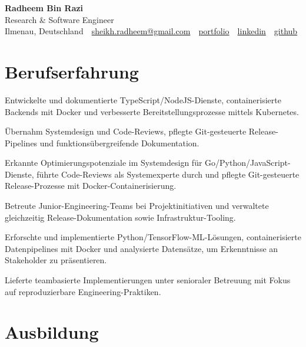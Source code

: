 \documentclass[11pt,a4paper]{resume}
\makeatletter
\newcommand{\Portfolio}{https://radheem.github.io/my-cv}
\newcommand{\PortfolioText}{portfolio}
\newcommand{\GitHub}{https://github.com/radheem}
\newcommand{\LinkedIn}{https://www.linkedin.com/in/radheem-razi}
\newcommand{\Email}{sheikh.radheem@gmail.com}
\makeatother
\begin{document}
\clearpage
{}

\begin{center}
  {\huge\bfseries Radheem Bin Razi}\\[3pt]
  {\large Research \& Software Engineer}\\[6pt]
  \small
  Ilmenau, Deutschland \,\textbar\,
  \href{mailto:\Email}{\Email} \,\textbar\,
  \href{\Portfolio}{\PortfolioText} \,\textbar\,
  \href{\LinkedIn}{linkedin} \,\textbar\,
  \href{\GitHub}{github}
\end{center}
\vspace{2pt}

\section{Berufserfahrung}

\bullets
  \item Entwickelte und dokumentierte TypeScript/NodeJS-Dienste, containerisierte Backends mit Docker und verbesserte Bereitstellungsprozesse mittels Kubernetes.
  \item Übernahm Systemdesign und Code-Reviews, pflegte Git-gesteuerte Release-Pipelines und funktionsübergreifende Dokumentation.
\bulletsend
\vspace{3pt}
\bullets
  \item Erkannte Optimierungspotenziale im Systemdesign für Go/Python/JavaScript-Dienste, führte Code-Reviews als Systemexperte durch und pflegte Git-gesteuerte Release-Prozesse mit Docker-Containerisierung.
  \item Betreute Junior-Engineering-Teams bei Projektinitiativen und verwaltete gleichzeitig Release-Dokumentation sowie Infrastruktur-Tooling.
\bulletsend
\vspace{3pt}
\bullets
  \item Erforschte und implementierte Python/TensorFlow-ML-Lösungen, containerisierte Datenpipelines mit Docker und analysierte Datensätze, um Erkenntnisse an Stakeholder zu präsentieren.
  \item Lieferte teambasierte Implementierungen unter senioraler Betreuung mit Fokus auf reproduzierbare Engineering-Praktiken.
\bulletsend
\vspace{3pt}

\section{Ausbildung}
\end{document}

